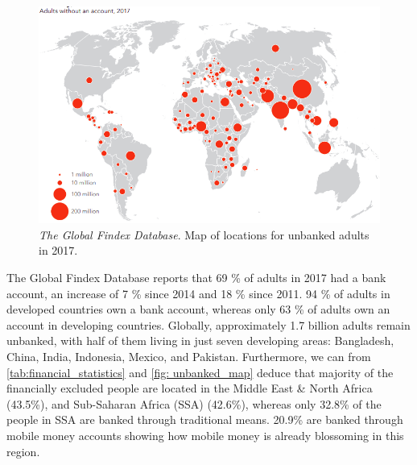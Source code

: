 \documentclass[11pt, a4paper]{article}
\begin{document}
\begin{figure}[ht]
\centering
\includegraphics[width=1\linewidth]{figs/unbanked_map}
\caption{\textit{The Global Findex Database}. Map of locations for unbanked adults in 2017.}
\label{fig: unbanked_map}
\end{figure}


The Global Findex Database reports that 69 \% of adults in 2017 had a bank account\cite{gfindex}, an increase of 7 \% since 2014 and 18 \% since 2011\cite{gfindex}. 94 \% of adults in developed countries own a bank account, whereas only 63 \% of adults own an account in developing countries\cite{gfindex}. Globally, approximately 1.7 billion adults remain unbanked, with half of them living in just seven developing areas: Bangladesh, China, India, Indonesia, Mexico, and Pakistan. Furthermore, we can from \autoref{tab:financial_statistics} and \autoref{fig: unbanked_map} deduce that majority of the financially excluded people are located in the Middle East \& North Africa (43.5\%), and Sub-Saharan Africa (SSA) (42.6\%), whereas only 32.8\% of the people in SSA are banked through traditional means. 20.9\% are banked through mobile money accounts showing how mobile money is already blossoming in this region.
\end{document}
